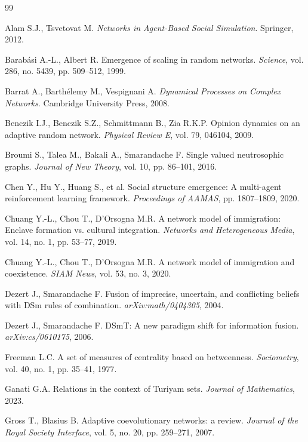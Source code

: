 \documentclass[11pt,a4paper]{article}
\begin{document}
	\begin{thebibliography}{99}
		
		 Alam S.J., Tsvetovat M. \textit{Networks in Agent-Based Social Simulation}. Springer, 2012.
		
		 Barab\'asi A.-L., Albert R. Emergence of scaling in random networks. \textit{Science}, vol. 286, no. 5439, pp. 509--512, 1999.
		
		 Barrat A., Barth\'elemy M., Vespignani A. \textit{Dynamical Processes on Complex Networks}. Cambridge University Press, 2008.
		
		 Benczik I.J., Benczik S.Z., Schmittmann B., Zia R.K.P. Opinion dynamics on an adaptive random network. \textit{Physical Review E}, vol. 79, 046104, 2009.
		
		 Broumi S., Talea M., Bakali A., Smarandache F. Single valued neutrosophic graphs. \textit{Journal of New Theory}, vol. 10, pp. 86--101, 2016.
		
		 Chen Y., Hu Y., Huang S., et al. Social structure emergence: A multi-agent reinforcement learning framework. \textit{Proceedings of AAMAS}, pp. 1807--1809, 2020.
		
		 Chuang Y.-L., Chou T., D'Orsogna M.R. A network model of immigration: Enclave formation vs. cultural integration. \textit{Networks and Heterogeneous Media}, vol. 14, no. 1, pp. 53--77, 2019.
		
		 Chuang Y.-L., Chou T., D'Orsogna M.R. A network model of immigration and coexistence. \textit{SIAM News}, vol. 53, no. 3, 2020.
		
		 Dezert J., Smarandache F. Fusion of imprecise, uncertain, and conflicting beliefs with DSm rules of combination. \textit{arXiv:math/0404305}, 2004.
		
		 Dezert J., Smarandache F. DSmT: A new paradigm shift for information fusion. \textit{arXiv:cs/0610175}, 2006.
		
		 Freeman L.C. A set of measures of centrality based on betweenness. \textit{Sociometry}, vol. 40, no. 1, pp. 35--41, 1977.
		
		 Ganati G.A. Relations in the context of Turiyam sets. \textit{Journal of Mathematics}, 2023.
		
		 Gross T., Blasius B. Adaptive coevolutionary networks: a review. \textit{Journal of the Royal Society Interface}, vol. 5, no. 20, pp. 259--271, 2007.
		

\end{thebibliography}
\end{document}
